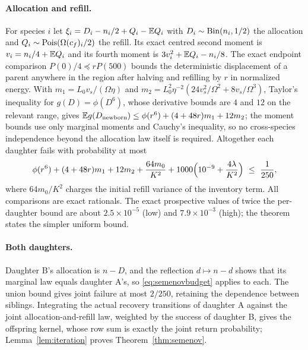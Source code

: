 \paragraph{Allocation and refill.}
For species $i$ let $\xi_i=D_i-n_i/2+Q_i-\mathbb E Q_i$ with $D_i\sim\operatorname{Bin}(n_i,1/2)$ the allocation and $Q_i\sim\operatorname{Pois}(\Omega(c_f)_i/2)$ the refill. Its exact centred second moment is $v_i=n_i/4+\mathbb E Q_i$ and its fourth moment is $3v_i^2+\mathbb E Q_i-n_i/8$. The exact endpoint comparison $P(0)/4\preceq rP(500)$ bounds the deterministic displacement of a parent anywhere in the region after halving and refilling by $r$ in normalized energy. With $m_1=L_0v_s/(\Omega\eta)$ and $m_2=L_0^2\eta^{-2}(24v_s^2/\Omega^2+8v_s/\Omega^3)$, Taylor's inequality for $g(D)=\phi(D^6)$, whose derivative bounds are $4$ and $12$ on the relevant range, gives $\mathbb E g(D_{\rm newborn})\le\phi(r^6)+(4+48r)m_1+12m_2$; the moment bounds use only marginal moments and Cauchy's inequality, so no cross-species independence beyond the allocation law itself is required. Altogether each daughter fails with probability at most
\begin{equation}\label{eq:semenovbudget}
 \phi(r^6)+(4+48r)m_1+12m_2+\frac{64m_0}{K^2}+1000\Bigl(10^{-9}+\frac{4\lambda}{K^2}\Bigr)\ \le\ \frac1{250},
\end{equation}
where $64m_0/K^2$ charges the initial refill variance of the inventory term. All comparisons are exact rationals. The exact prospective values of twice the per-daughter bound are about $2.5\times10^{-5}$ (low) and $7.9\times10^{-3}$ (high); the theorem states the simpler uniform bound.

\paragraph{Both daughters.}
Daughter B's allocation is $n-D$, and the reflection $d\mapsto n-d$ shows that its marginal law equals daughter A's, so \eqref{eq:semenovbudget} applies to each. The union bound gives joint failure at most $2/250$, retaining the dependence between siblings. Integrating the actual recovery transitions of daughter A against the joint allocation-and-refill law, weighted by the success of daughter B, gives the offspring kernel, whose row sum is exactly the joint return probability; Lemma~\ref{lem:iteration} proves Theorem~\ref{thm:semenov}.

